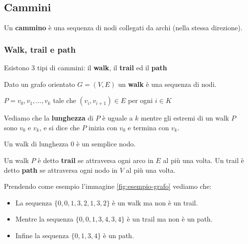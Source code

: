 \newpage
\subsection{Cammini}
\begin{definition}[Cammino]
    Un \textbf{cammino} è una sequenza di nodi collegati da archi (nella stessa direzione).
\end{definition}

\subsubsection{Walk, trail e path}
Esistono 3 tipi di cammini: il \textbf{walk}, il \textbf{trail} ed il \textbf{path}
\begin{definition}[Walk]
    Dato un grafo orientato $G = (V,E)$ un \textbf{walk} è una sequenza di nodi.
    \begin{center}
        $P = v_0, v_1, \ldots, v_k$ tale che $(v_i,v_{i+1}) \in E$ per ogni $i \in K$
    \end{center}
\end{definition}
\hspace{-15pt}Vediamo che la \textbf{lunghezza} di $P$ è uguale a $k$ mentre gli estremi di un walk $P$ sono $v_0$ e $v_k$, e si dice che $P$ inizia con $v_0$ e termina con $v_k$.
\begin{note}
Un walk di lunghezza $0$ è un semplice nodo.
\end{note}

\begin{definition}
    Un walk $P$ è detto \textbf{trail} se attraversa ogni arco in $E$ al più una volta. Un trail è detto \textbf{path} se attraversa ogni nodo in $V$ al più una volta.
\end{definition}

\begin{example}
    Prendendo come esempio l'immagine \ref{fig:esempio-grafo} vediamo che:
    \begin{itemize}
        \item La sequenza $\{0, 0, 1, 3, 2, 1, 3, 2\}$ è un walk ma non è un trail.
        \item Mentre la sequenza $\{0, 0, 1, 3, 4, 3, 4\}$ è un trail ma non è un path.
        \item Infine la sequenza $\{0, 1, 3, 4\}$ è un path.
    \end{itemize}
\end{example}


